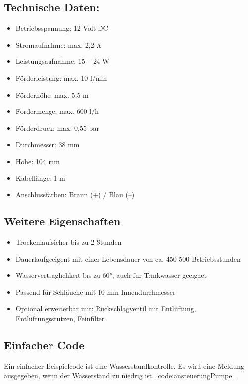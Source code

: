 \subsection*{Technische Daten:}
\begin{itemize}
	\item Betriebsspannung: 12 Volt DC
	\item Stromaufnahme: max. 2,2 A
	\item Leistungsaufnahme: 15 – 24 W
	\item Förderleistung: max. 10 l/min
	\item Förderhöhe: max. 5,5 m
	\item Fördermenge: max. 600 l/h
	\item Förderdruck: max. 0,55 bar 
	\item Durchmesser: 38 mm
	\item Höhe: 104 mm
	\item Kabellänge: 1 m
	\item Anschlussfarben: Braun (+) / Blau (–)
\end{itemize}
\subsection*{Weitere Eigenschaften}
\begin{itemize}
	\item Trockenlaufsicher bis zu 2 Stunden
	\item Dauerlaufgeeigent mit einer Lebensdauer von ca. 450-500 Betriebsstunden 
	\item Wasserverträglichkeit bis zu 60°, auch für Trinkwasser geeignet
	\item Passend für Schläuche mit 10 mm Innendurchmesser
	\item Optional erweiterbar mit: Rückschlagventil mit Entlüftung, Entlüftungsstutzen, Feinfilter 
\end{itemize}
\cite{Comet:2004} \cite{ConradPumpe:2025}


\subsection{Einfacher Code}
Ein einfacher Beispielcode ist eine Wasserstandkontrolle. Es wird eine Meldung ausgegeben, wenn der Wasserstand zu niedrig ist. \ref{code:ansteuerungPumpe}

\begin{code}[H]
	\caption{Einfacher Code zur Ansteuerung einer Pumpe}
	\label{code:ansteuerungPumpe}
\end{code}

